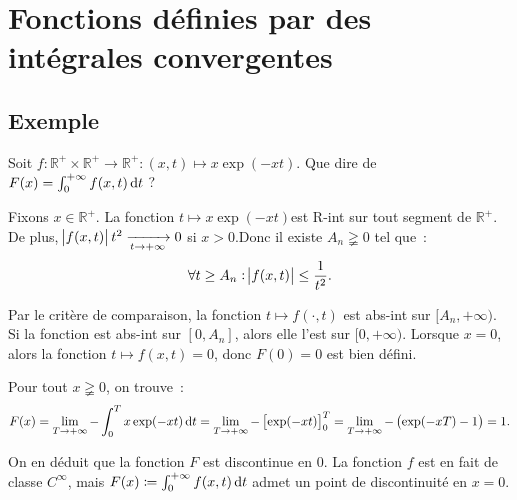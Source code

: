 \documentclass{report}
\theoremstyle{definition}
\theoremstyle{remark}
\numberwithin{equation}{section}
\newcommand{\R}{\mathbb R}
\newcommand{\Rp}{\R^{+}}
\newcommand{\pinfty}{{+\infty}}
\begin{document}
	\section{Fonctions définies par des intégrales convergentes}
		\subsection{Exemple}\label{subsec:exempleintconv}
			Soit $f : \Rp \times \Rp \to \Rp : (x, t) \mapsto x\exp(-xt)$. Que dire de $F(x) = \int_0^\pinfty f(x, t)\dif t$ ?

			Fixons $x \in \Rp$. La fonction $t \mapsto x\exp(-xt)$est R-int sur tout segment de $\Rp$. De plus, $\abs {f(x, t)}t^2 \xrightarrow[t \to \pinfty]{} 0$
			si $x > 0$.Donc il existe $A_n \gneqq 0$ tel que~:
			\begin{equation}
				\forall t \geq A_n : \abs {f(x, t)} \leq \frac 1{t^2}.
			\end{equation}

			Par le critère de comparaison, la fonction $t \mapsto f(\cdot, t)$ est abs-int sur $[A_n, \pinfty)$. Si la fonction est abs-int sur $[0, A_n]$, alors
			elle l'est sur $[0, \pinfty)$. Lorsque $x = 0$, alors la fonction $t \mapsto f(x, t) = 0$, donc $F(0) = 0$ est bien défini.

			Pour tout $x \gneqq 0$, on trouve~:
			\begin{equation}
				F(x) = \lim_{T \to \pinfty}-\int_0^Tx\exp(-xt)\dif t = \lim_{T \to \pinfty}-\left[\exp(-xt)\right]_0^T
				= \lim_{T \to \pinfty} -\left(\exp(-xT) - 1\right) = 1.
			\end{equation}

			On en déduit que la fonction $F$ est discontinue en $0$. La fonction $f$ est en fait de classe $C^\infty$, mais
			$F(x) \coloneqq \int_0^\pinfty f(x, t)\dif t$ admet un point de discontinuité en $x = 0$.
\end{document}
